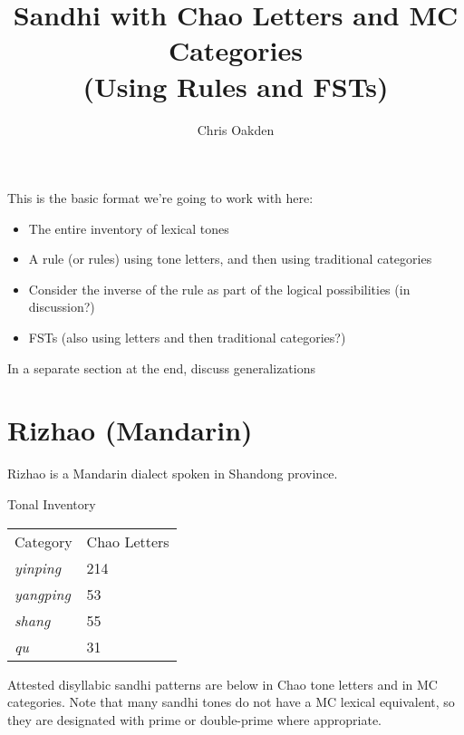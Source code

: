 \documentclass{article}
\title{
	Sandhi with Chao Letters and MC Categories \\
	\large (Using Rules and FSTs)
	}
\author{Chris Oakden}
\begin{document}
\maketitle
This is the basic format we're going to work with here:
\begin{itemize}
	\item The entire inventory of lexical tones
	\item A rule (or rules) using tone letters, and then using traditional categories
	\item Consider the inverse of the rule as part of the logical possibilities (in discussion?)
	\item FSTs (also using letters and then traditional categories?)
\end{itemize}
In a separate section at the end, discuss generalizations
\section{Rizhao (Mandarin)}
Rizhao is a Mandarin dialect spoken in Shandong province.\cite{Wuandliu2010}
\begin{exe}
\ex Tonal Inventory \\
\begin{tabular}[t]{|ll|}
\hline
Category & Chao Letters \\
\textit{yinping} & 214 \\
\textit{yangping} & 53 \\
\textit{shang} & 55 \\
\textit{qu} & 31 \\
\hline
\end{tabular}
\end{exe}
Attested disyllabic sandhi patterns are below in Chao tone letters and in MC categories. Note that many sandhi tones do not have a MC lexical equivalent, so they are designated with prime or double-prime where appropriate.
\end{document}
